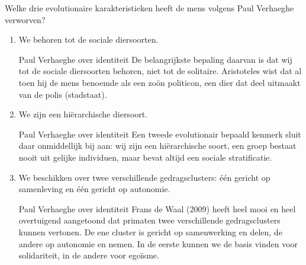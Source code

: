 \documentclass[main.tex]{subfiles}
\begin{document}
\begin{examenvraag}
    \begin{vraag}
        Welke drie evolutionaire karakteristieken heeft de mens volgens Paul Verhaeghe verworven?
    \end{vraag}

    \begin{antwoord}
        \begin{enumerate}
            \item We behoren tot de sociale diersoorten.
                \begin{citaat}{Paul Verhaeghe over identiteit}
                    De belangrijkste bepaling daarvan is dat wij tot de sociale diersoorten behoren, niet tot de solitaire.
                    Aristoteles wist dat al toen hij de mens benoemde als een zoön politicon, een dier dat deel uitmaakt van de polis (stadstaat).
                \end{citaat}
            \item We zijn een hiërarchische diersoort.
                \begin{citaat}{Paul Verhaeghe over identiteit}
                    Een tweede evolutionair bepaald kenmerk sluit daar onmiddellijk bij aan: wij zijn een hiërarchische soort, een groep bestaat nooit uit gelijke individuen, maar bevat altijd een sociale stratificatie.
                \end{citaat}
            \item We beschikken over twee verschillende gedragsclusters: \'e\'en gericht op samenleving en \'e\'en gericht op autonomie.
                \begin{citaat}{Paul Verhaeghe over identiteit}
                    Frans de Waal (2009) heeft heel mooi en heel overtuigend aangetoond dat primaten twee verschillende gedragsclusters kunnen vertonen.
                    De ene cluster is gericht op samenwerking en delen, de andere op autonomie en nemen.
                    In de eerste kunnen we de basis vinden voor solidariteit, in de andere voor egoïsme.
                \end{citaat}
        \end{enumerate}

    \end{antwoord}
\end{examenvraag}
\end{document}
